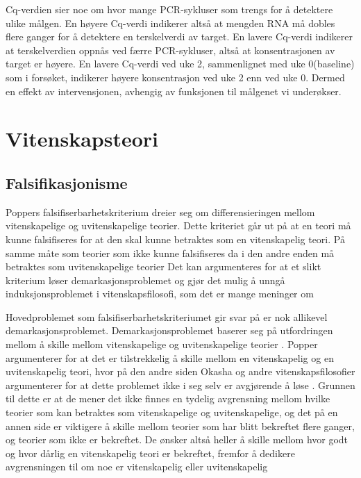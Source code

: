 \documentclass[
]{book}
\begin{document}
Cq-verdien sier noe om hvor mange PCR-sykluser som trengs for å detektere ulike målgen\citep{kuang2018}. En høyere Cq-verdi indikerer altså at mengden RNA må dobles flere ganger for å detektere en terskelverdi av target. En lavere Cq-verdi indikerer at terskelverdien oppnås ved færre PCR-sykluser, altså at konsentrasjonen av target er høyere. En lavere Cq-verdi ved uke 2, sammenlignet med uke 0(baseline) som i forsøket, indikerer høyere konsentrasjon ved uke 2 enn ved uke 0. Dermed en effekt av intervensjonen, avhengig av funksjonen til målgenet vi underøkser.

\hypertarget{vitenskapsteori}{%
\chapter{Vitenskapsteori}\label{vitenskapsteori}}

\hypertarget{falsifikasjonisme}{%
\section{Falsifikasjonisme}\label{falsifikasjonisme}}

Poppers falsifiserbarhetskriterium dreier seg om differensieringen mellom vitenskapelige og uvitenskapelige teorier. Dette kriteriet går ut på at en teori må kunne falsifiseres for at den skal kunne betraktes som en vitenskapelig teori. På samme måte som teorier som ikke kunne falsifiseres da i den andre enden må betraktes som uvitenskapelige teorier\citep{popper2002} Det kan argumenteres for at et slikt kriterium løser demarkasjonsproblemet og gjør det mulig å unngå induksjonsproblemet i vitenskapsfilosofi, som det er mange meninger om \citep{popper2002, vickers2006}

Hovedproblemet som falsifiserbarhetskriteriumet gir svar på er nok allikevel demarkasjonsproblemet. Demarkasjonsproblemet baserer seg på utfordringen mellom å skille mellom vitenskapelige og uvitenskapelige teorier \citep{popper2002}. Popper argumenterer for at det er tilstrekkelig å skille mellom en vitenskapelig og en uvitenskapelig teori, hvor på den andre siden Okasha og andre vitenskapsfilosofier argumenterer for at dette problemet ikke i seg selv er avgjørende å løse \citep{okasha2016}. Grunnen til dette er at de mener det ikke finnes en tydelig avgrensning mellom hvilke teorier som kan betraktes som vitenskapelige og uvitenskapelige, og det på en annen side er viktigere å skille mellom teorier som har blitt bekreftet flere ganger, og teorier som ikke er bekreftet. De ønsker altså heller å skille mellom hvor godt og hvor dårlig en vitenskapelig teori er bekreftet, fremfor å dedikere avgrensningen til om noe er vitenskapelig eller uvitenskapelig \citep{popper2002, okasha2016, vickers2006}
\end{document}
